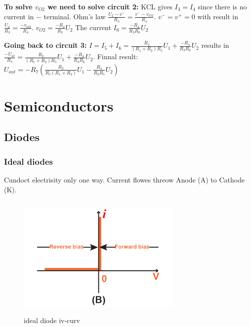 \textbf{To solve $v_{O2}$ we need to solve circuit 2:} \newline
KCL gives $I_3=I_4$ since there is no current in $-$ terminal. \newline
Ohm's law $\frac{U_2-v^-}{R_3}=\frac{v^--v_{O2}}{R_4}$. \newline
$v^-=v^+=0$ with result in $\frac{U_2}{R_3}=\frac{-v_{O2}}{R_4}$. \newline
$v_{O2}=\frac{-R_4}{R_3}U_2$ \newline
The current $I_6=\frac{-R_4}{R_3R_6}U_2$ \newline
\vspace{3mm}

\textbf{Going back to circuit 3:} \newline
$I=I_5+I_6=\frac{R_2}{(R_1+R_2)R_5}U_1+\frac{-R_4}{R_3R_6}U_2$ \newline
results in $\frac{-U_{ut}}{R_7}=\frac{R_2}{(R_1+R_2)R_5}U_1+\frac{-R_4}{R_3R_6}U_2$. \newline
Finnal result: $U_{out}=-R_7(\frac{R_2}{R_5(R_1+R_2)}U_1-\frac{R_4}{R_3R_5}U_2)$

\newpage
\section{Semiconductors}
\subsection{Diodes}
\subsubsection{Ideal diodes}
Cundoct electrisity only one way. Current flowes threow Anode (A) to Cathode (K).
\begin{figure}[h]
    \centering
    \includegraphics[width=8cm, height=6cm]{image/ideal-diode.jpg}
    \caption{ideal diode iv-curv}
\end{figure}

